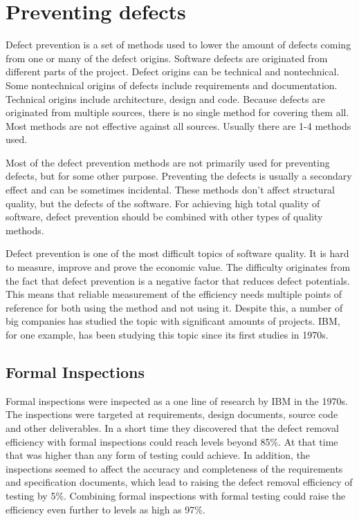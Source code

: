 
 \section{Preventing defects}

Defect prevention is a set of methods used to lower the amount of defects coming from one or many of the defect origins. Software defects are originated from different parts of the project. Defect origins can be technical and nontechnical. Some nontechnical origins of defects include requirements and documentation. Technical origins include architecture, design and code. Because defects are originated from multiple sources, there is no single method for covering them all. Most methods are not effective against all sources. Usually there are 1-4 methods used.

Most of the defect prevention methods are not primarily used for preventing defects, but for some other purpose. Preventing the defects is usually a secondary effect and can be sometimes incidental. These methods don't affect structural quality, but the defects of the software. For achieving high total quality of software, defect prevention should be combined with other types of quality methods.

Defect prevention is one of the most difficult topics of software quality. It is hard to measure, improve and prove the economic value. The difficulty originates from the fact that defect prevention is a negative factor that reduces defect potentials. This means that reliable measurement of the efficiency needs multiple points of reference for both using the method and not using it. Despite this, a number of big companies has studied the topic with significant amounts of projects. IBM, for one example, has been studying this topic since its first studies in 1970s. 


\subsection{Formal Inspections} 
Formal inspections were inspected as a one line of research by IBM in the 1970s. The inspections were targeted at requirements, design documents, source code and other deliverables. In a short time they discovered that the defect removal efficiency with formal inspections could reach levels beyond 85\%. At that time that was higher than any form of testing could achieve. In addition, the inspections seemed to affect the accuracy and completeness of the requirements and specification documents, which lead to raising the defect removal efficiency of testing by 5\%. Combining formal inspections with formal testing could raise the efficiency even further to levels as high as 97\%. 


